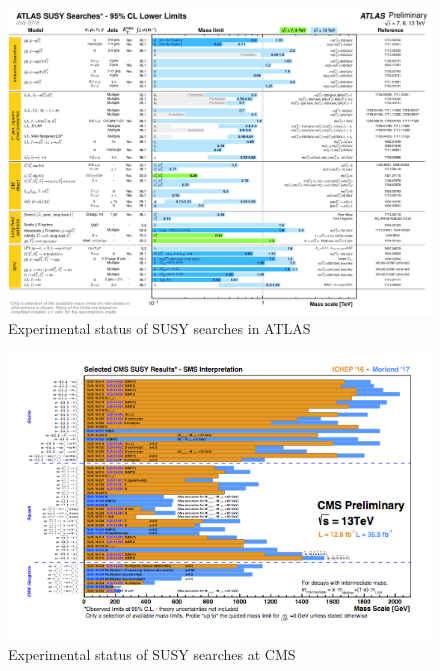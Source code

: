\begin{figure} [htb!]
\begin{center}
\includegraphics[scale=0.15]{figs/ATLAS_SUSY_Summary.png}
\caption{Experimental status of SUSY searches in ATLAS\label{fig:ATLASSUSYexp} }
\end{center}
\end{figure}

\begin{figure} [htb!]
\begin{center}
\includegraphics[scale=0.70]{figs/CMS_SUSY_Summary.png}
\caption{Experimental status of SUSY searches at CMS\label{fig:CMSSUSYexp} }
\end{center}
\end{figure}


